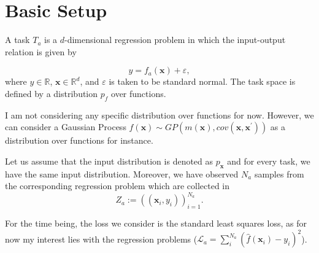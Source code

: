 \documentclass{tran-l}
\theoremstyle{definition}
\theoremstyle{remark}
\numberwithin{equation}{section}
\newcommand{\mR}{\mathbb{R}}
\begin{document}
\section{Basic Setup}

A task $T_a$ is a $d$-dimensional regression problem in which the input-output relation is given by

\begin{equation}
y = f_a(\mathbf{x}) + \varepsilon,
\end{equation}
where $y\in\mR$, $\mathbf{x} \in \mR^d$, and $\varepsilon$ is taken to be standard normal.  The task space is defined by a distribution $p_f$ over functions. 

\rem I am not considering any specific distribution over functions for now. However, we can consider a Gaussian Process $f(\mathbf{x}) \sim GP(m(\mathbf{x}), cov(\mathbf{x},\mathbf{x}^\prime))$ as a distribution over functions for instance.

Let us assume that the input distribution is denoted as $p_{\mathbf{x}}$ and for every task, we have the same input distribution. Moreover,  we have observed $N_a$ samples from the corresponding regression problem which are collected in
\begin{equation}
Z_a:=\left((\mathbf{x}_i,y_i)\right)_{i=1}^{N_a}.
\end{equation}

For the time being, the loss we consider is the standard least squares loss, as for now my interest lies with the regression problems ($\mathcal{L}_a=\sum_i^{N_a}(\hat{f}(\mathbf{x}_i)-y_i)^2$).
\end{document}
